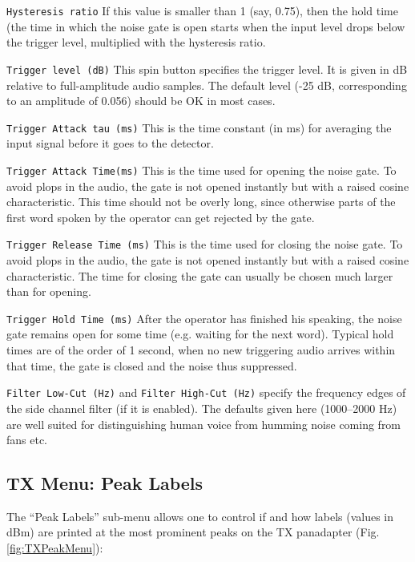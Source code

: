 \documentclass[12pt]{book}
\def\rett#1{\texttt{\color{red}#1}}
\begin{document}
\rett{Hysteresis ratio} If this  value is smaller than 1 (say, 0.75), then the hold time (the time in which the noise
gate is open starts when the input level drops below the trigger level, multiplied with the hysteresis ratio.

\rett{Trigger level (dB)} This spin button specifies the trigger level. It is given in dB relative to
full-amplitude audio samples. The default level (-25 dB, corresponding to an amplitude of 0.056) should
be OK in most cases.

\rett{Trigger Attack tau (ms)} This is the time constant (in ms) for averaging the input signal before
it goes to the detector.

\rett{Trigger Attack Time(ms)} This is the time used for opening the noise gate. To avoid plops in the
audio, the gate is not opened instantly but with a raised cosine characteristic. This time should not
be overly long, since otherwise parts of the first word spoken by the operator can get rejected by
the gate.

\rett{Trigger Release Time (ms)} This is the time used for closing the noise  gate. To avoid plops in the
audio, the gate is not opened instantly but with a raised cosine characteristic. The time for closing the
gate can usually be chosen much larger than for  opening.

\rett{Trigger Hold Time (ms)} After the operator has finished his speaking, the noise gate remains open
for some time (e.g. waiting for the next word). Typical hold times are of the order of 1 second, when no
new triggering audio arrives within that time, the gate is closed and the noise  thus suppressed.

\rett{Filter Low-Cut (Hz)} and \rett{Filter  High-Cut (Hz)} specify the frequency edges of the side
channel filter (if it is enabled). The defaults given here (1000--2000 Hz) are well suited  for distinguishing
human voice from humming noise coming from fans etc.

\subsection{TX Menu: Peak Labels}

The ``Peak Labels'' sub-menu allows one to control if and how labels
(values in dBm) are printed at the most prominent peaks on the
TX panadapter (Fig. \ref{fig:TXPeakMenu}):
\end{document}
